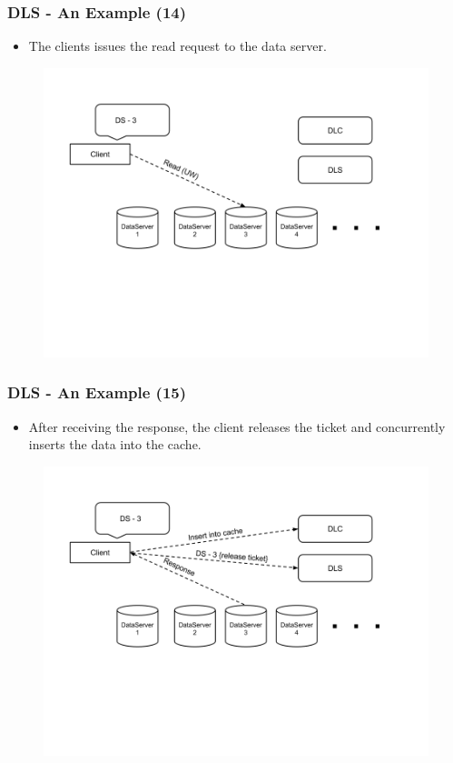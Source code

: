 \documentclass{beamer}
\begin{document}
\begin{frame}
  \frametitle{DLS - An Example (14)}
  \begin{itemize}
  \item The clients issues the read request to the data server.
\newline
  \end{itemize}
  \begin{figure}
    \begin{center}
      \centerline{\includegraphics[scale=0.35]{img/DLS_Example11.png}}
    \end{center}
  \end{figure}
\end{frame}

\begin{frame}
  \frametitle{DLS - An Example (15)}
  \begin{itemize}
  \item After receiving the response, the client releases
    the ticket and concurrently inserts the data into the cache.
  \end{itemize}
  \begin{figure}
    \begin{center}
      \centerline{\includegraphics[scale=0.35]{img/DLS_Example12.png}}
    \end{center}
  \end{figure}
\end{frame}
\end{document}
